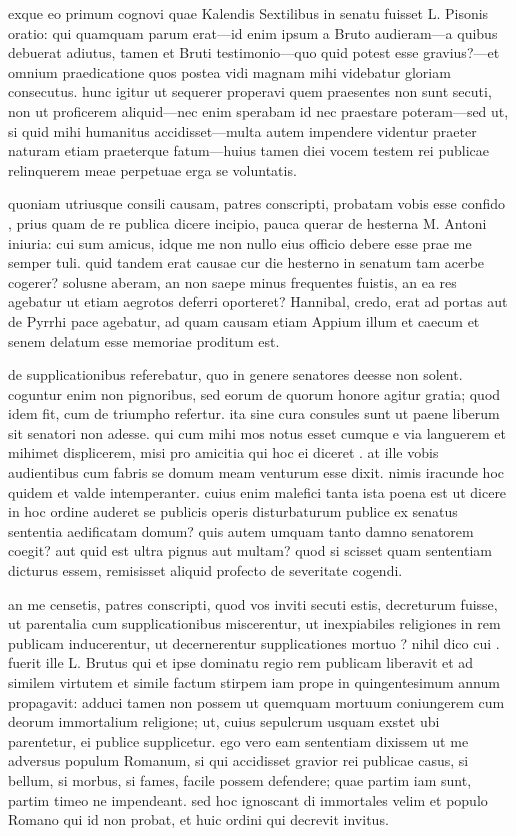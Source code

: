  exque eo primum cognovi quae Kalendis Sextilibus in senatu fuisset L. Pisonis oratio: qui quamquam parum erat—id enim ipsum a Bruto audieram—a quibus debuerat adiutus, tamen et Bruti testimonio—quo quid potest esse gravius?—et omnium praedicatione quos postea vidi magnam mihi videbatur gloriam consecutus. hunc igitur ut sequerer properavi quem praesentes non sunt secuti, non ut proficerem aliquid—nec enim sperabam id nec praestare poteram—sed ut, si quid mihi humanitus accidisset—multa autem impendere videntur praeter naturam etiam praeterque fatum—huius tamen diei vocem testem rei publicae relinquerem meae perpetuae erga se voluntatis.

 quoniam utriusque consili causam, patres conscripti, probatam vobis esse confido , prius quam de re publica dicere incipio, pauca querar de hesterna M. Antoni iniuria: cui sum amicus, idque me non nullo eius officio debere esse prae me semper tuli. quid tandem erat causae cur die hesterno in senatum tam acerbe cogerer? solusne aberam, an non saepe minus frequentes fuistis, an ea res agebatur ut etiam aegrotos deferri oporteret? Hannibal, credo, erat ad portas aut de Pyrrhi pace agebatur, ad quam causam etiam Appium illum et caecum et senem delatum esse memoriae proditum est.

 de supplicationibus referebatur, quo in genere senatores deesse non solent. coguntur enim non pignoribus, sed eorum de quorum honore agitur gratia; quod idem fit, cum de triumpho refertur. ita sine cura consules sunt ut paene liberum sit senatori non adesse. qui cum mihi mos notus esset cumque e via languerem et mihimet displicerem, misi pro amicitia qui hoc ei diceret . at ille vobis audientibus cum fabris se domum meam venturum esse dixit. nimis iracunde hoc quidem et valde intemperanter. cuius enim malefici tanta ista poena est ut dicere in hoc ordine auderet se publicis operis disturbaturum publice ex senatus sententia aedificatam domum? quis autem umquam tanto damno senatorem coegit? aut quid est ultra pignus aut multam? quod si scisset quam sententiam dicturus essem, remisisset aliquid profecto de severitate cogendi.

 an me censetis, patres conscripti, quod vos inviti secuti estis, decreturum fuisse, ut parentalia cum supplicationibus miscerentur, ut inexpiabiles religiones in rem publicam inducerentur, ut decernerentur supplicationes mortuo ? nihil dico cui . fuerit ille L. Brutus qui et ipse dominatu regio rem publicam liberavit et ad similem virtutem et simile factum stirpem iam prope in quingentesimum annum propagavit: adduci tamen non possem ut quemquam mortuum coniungerem cum deorum immortalium religione; ut, cuius sepulcrum usquam exstet ubi parentetur, ei publice supplicetur. ego vero eam sententiam dixissem ut me adversus populum Romanum, si qui accidisset gravior rei publicae casus, si bellum, si morbus, si fames, facile possem defendere; quae partim iam sunt, partim timeo ne impendeant. sed hoc ignoscant di immortales velim et populo Romano qui id non probat, et huic ordini qui decrevit invitus.

